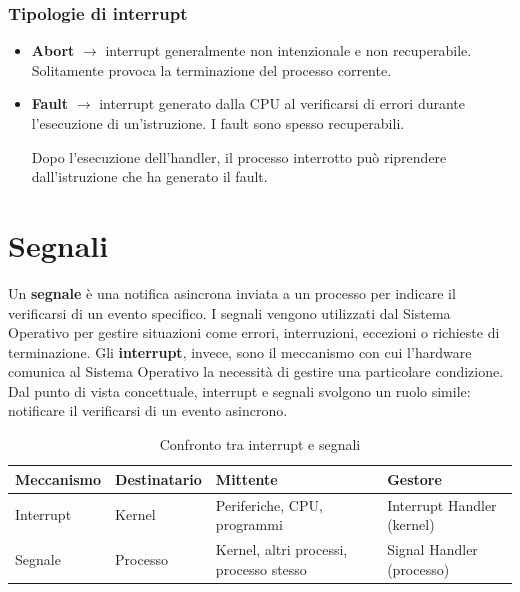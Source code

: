 \subsubsection*{Tipologie di interrupt}

\begin{itemize}
    \item \textbf{Abort} $\rightarrow$ interrupt generalmente non intenzionale e non recuperabile.
    Solitamente provoca la terminazione del processo corrente.

    \item \textbf{Fault} $\rightarrow$ interrupt generato dalla CPU al verificarsi di errori
    durante l'esecuzione di un'istruzione. 
    I fault sono spesso recuperabili.
    
    Dopo l'esecuzione dell'handler, il processo interrotto può riprendere
    dall'istruzione che ha generato il fault.
\end{itemize}
\newpage
\section{Segnali}

Un \textbf{segnale} è una notifica asincrona inviata a un processo per indicare il verificarsi di un evento specifico.  
I segnali vengono utilizzati dal Sistema Operativo per gestire situazioni come errori, interruzioni, eccezioni o richieste di terminazione.
Gli \textbf{interrupt}, invece, sono il meccanismo con cui l'hardware comunica al Sistema Operativo la necessità di gestire una particolare condizione.  
Dal punto di vista concettuale, interrupt e segnali svolgono un ruolo simile: notificare il verificarsi di un evento asincrono.

\medskip

\begin{table}[H]
\centering
\begin{tabular}{|l|l|l|l|}
\hline
\textbf{Meccanismo} & \textbf{Destinatario} & \textbf{Mittente} & \textbf{Gestore} \\
\hline
Interrupt & Kernel 
          & Periferiche, CPU, programmi 
          & Interrupt Handler (kernel) \\
\hline
Segnale   & Processo 
          & Kernel, altri processi, processo stesso 
          & Signal Handler (processo) \\
\hline
\end{tabular}
\caption{Confronto tra interrupt e segnali}
\end{table}

